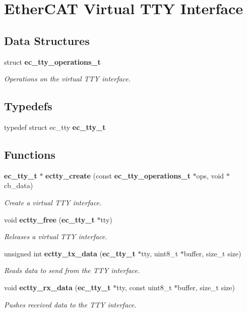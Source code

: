 \section{\-Ether\-C\-A\-T \-Virtual \-T\-T\-Y \-Interface}
\label{group__TTYInterface}
\subsection*{\-Data \-Structures}
\begin{DoxyCompactItemize}
\item 
struct {\bf ec\-\_\-tty\-\_\-operations\-\_\-t}
\begin{DoxyCompactList}\small\item\em \-Operations on the virtual \-T\-T\-Y interface. \end{DoxyCompactList}\end{DoxyCompactItemize}
\subsection*{\-Typedefs}
\begin{DoxyCompactItemize}
\item 
typedef struct ec\-\_\-tty {\bf ec\-\_\-tty\-\_\-t}
\end{DoxyCompactItemize}
\subsection*{\-Functions}
\begin{DoxyCompactItemize}
\item 
{\bf ec\-\_\-tty\-\_\-t} $\ast$ {\bf ectty\-\_\-create} (const {\bf ec\-\_\-tty\-\_\-operations\-\_\-t} $\ast$ops, void $\ast$cb\-\_\-data)
\begin{DoxyCompactList}\small\item\em \-Create a virtual \-T\-T\-Y interface. \end{DoxyCompactList}\item 
void {\bf ectty\-\_\-free} ({\bf ec\-\_\-tty\-\_\-t} $\ast$tty)
\begin{DoxyCompactList}\small\item\em \-Releases a virtual \-T\-T\-Y interface. \end{DoxyCompactList}\item 
unsigned int {\bf ectty\-\_\-tx\-\_\-data} ({\bf ec\-\_\-tty\-\_\-t} $\ast$tty, uint8\-\_\-t $\ast$buffer, size\-\_\-t size)
\begin{DoxyCompactList}\small\item\em \-Reads data to send from the \-T\-T\-Y interface. \end{DoxyCompactList}\item 
void {\bf ectty\-\_\-rx\-\_\-data} ({\bf ec\-\_\-tty\-\_\-t} $\ast$tty, const uint8\-\_\-t $\ast$buffer, size\-\_\-t size)
\begin{DoxyCompactList}\small\item\em \-Pushes received data to the \-T\-T\-Y interface. \end{DoxyCompactList}\end{DoxyCompactItemize}


